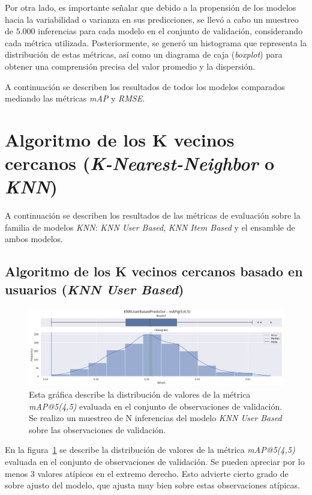 \documentclass[11pt,a4paper,twoside]{thesis}
\begin{document}
Por otra lado, es importante señalar que debido a la propensión de los modelos
hacia la variabilidad o varianza en sus predicciones, se llevó a cabo un
muestreo de $5.000$ inferencias para cada modelo en el conjunto de validación,
considerando cada métrica utilizada. Posteriormente, se generó un histograma
que representa la distribución de estas métricas, así como un diagrama de caja
(\textit{boxplot}) para obtener una comprensión precisa del valor promedio y la
dispersión.

A continuación se describen los resultados de todos los modelos comparados
mediando las métricas \textit{mAP\makeatletter@k} y \textit{RMSE}.

\section{
  Algoritmo de los K vecinos cercanos
  (\textit{K-Nearest-Neighbor} o \textit{KNN}) }

A continuación se describen los resultados de las métricas de evaluación sobre
la familia de modelos \textit{KNN}: \textit{KNN User Based}, \textit{KNN Item
	Based} y el ensamble de ambos modelos.

\subsection{
	Algoritmo de los K vecinos cercanos basado
	en usuarios (\textit{KNN User Based})
}

\begin{figure}[!htb]
	\centering
	\includegraphics[width=15cm]{./images/metrics-knn-user-based-mapk.png}
	\caption{
		Esta gráfica describe la distribución de valores de la métrica
		\textit{mAP@5(4,5)} evaluada en el conjunto de observaciones de
		validación. Se realizo un muestreo de N inferencias del modelo
		\textit{KNN User Based} sobre las observaciones de validación.
	}
	\label{fig:knnUserMAP}
\end{figure}

En la figura~\ref{fig:knnUserMAP} se describe la distribución de valores de la
métrica \textit{mAP@5(4,5)} evaluada en el conjunto de observaciones de
validación. Se pueden apreciar por lo menos $3$ valores atípicos en el extremo
derecho. Esto advierte cierto grado de sobre ajusto del modelo, que ajusta muy
bien sobre estas observaciones atípicas.
\end{document}
